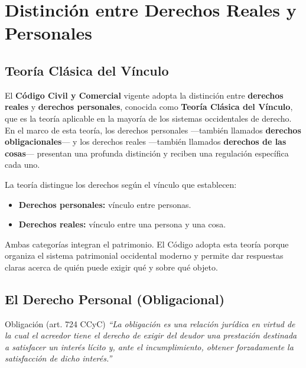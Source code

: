 \documentclass[12pt,oneside]{book}
\begin{document}
\tableofcontents

\chapter[Derechos reales y personales]{Distinci\'on entre Derechos Reales y Personales}

\section{Teor\'ia Cl\'asica del V\'inculo}

El \textbf{C\'odigo Civil y Comercial} vigente adopta la distinci\'on entre \textbf{derechos reales} y \textbf{derechos personales}, conocida como \textbf{Teor\'ia Cl\'asica del V\'inculo}, que es la teor\'ia aplicable en la mayor\'ia de los sistemas occidentales de derecho. En el marco de esta teor\'ia, los derechos personales ---tambi\'en llamados \textbf{derechos obligacionales}--- y los derechos reales ---tambi\'en llamados \textbf{derechos de las cosas}--- presentan una profunda distinci\'on y reciben una regulaci\'on espec\'ifica cada uno.

La teor\'ia distingue los derechos seg\'un el v\'inculo que establecen:

\begin{itemize}
    \item \textbf{Derechos personales:} v\'inculo entre personas.
    \item \textbf{Derechos reales:} v\'inculo entre una persona y una cosa.
\end{itemize}

Ambas categor\'ias integran el patrimonio. El C\'odigo adopta esta teor\'ia porque organiza el sistema patrimonial occidental moderno y permite dar respuestas claras acerca de qui\'en puede exigir qu\'e y sobre qu\'e objeto.

\section{El Derecho Personal (Obligacional)}

\begin{definition}{Obligaci\'on (art. 724 CCyC)}
\textit{``La obligaci\'on es una relaci\'on jur\'idica en virtud de la cual el acreedor tiene el derecho de exigir del deudor una prestaci\'on destinada a satisfacer un inter\'es l\'icito y, ante el incumplimiento, obtener forzadamente la satisfacci\'on de dicho inter\'es.''}
\end{definition}
\end{document}
